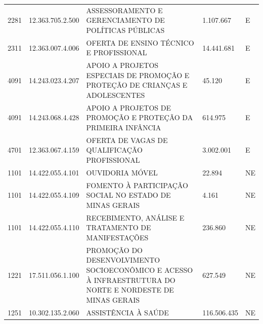 \documentclass{article}
\begin{document}
\begin{longtable}[c]{m{1cm}|m{2cm}|m{10cm}|m{2cm}|m{1cm}}
\multicolumn{1}{C{1cm}|}{2281} & \multicolumn{1}{C{2cm}|}{12.363.705.2.500} & \multicolumn{1}{L{10cm}|}{ASSESSORAMENTO E GERENCIAMENTO DE POLÍTICAS PÚBLICAS} & \multicolumn{1}{R{2cm}|}{1.107.667} & \multicolumn{1}{C{1cm}}{E} \\
\multicolumn{1}{C{1cm}|}{2311} & \multicolumn{1}{C{2cm}|}{12.363.007.4.006} & \multicolumn{1}{L{10cm}|}{OFERTA DE ENSINO TÉCNICO E PROFISSIONAL} & \multicolumn{1}{R{2cm}|}{14.441.681} & \multicolumn{1}{C{1cm}}{E} \\
\multicolumn{1}{C{1cm}|}{4091} & \multicolumn{1}{C{2cm}|}{14.243.023.4.207} & \multicolumn{1}{L{10cm}|}{APOIO A PROJETOS ESPECIAIS DE PROMOÇÃO E PROTEÇÃO DE CRIANÇAS E ADOLESCENTES} & \multicolumn{1}{R{2cm}|}{45.120} & \multicolumn{1}{C{1cm}}{E} \\
\multicolumn{1}{C{1cm}|}{4091} & \multicolumn{1}{C{2cm}|}{14.243.068.4.428} & \multicolumn{1}{L{10cm}|}{APOIO A PROJETOS DE PROMOÇÃO E PROTEÇÃO DA PRIMEIRA INFÂNCIA} & \multicolumn{1}{R{2cm}|}{614.975} & \multicolumn{1}{C{1cm}}{E} \\
\multicolumn{1}{C{1cm}|}{4701} & \multicolumn{1}{C{2cm}|}{12.363.067.4.159} & \multicolumn{1}{L{10cm}|}{OFERTA DE VAGAS DE QUALIFICAÇÃO PROFISSIONAL} & \multicolumn{1}{R{2cm}|}{3.002.001} & \multicolumn{1}{C{1cm}}{E} \\
\multicolumn{1}{C{1cm}|}{1101} & \multicolumn{1}{C{2cm}|}{14.422.055.4.101} & \multicolumn{1}{L{10cm}|}{OUVIDORIA MÓVEL} & \multicolumn{1}{R{2cm}|}{22.894} & \multicolumn{1}{C{1cm}}{NE} \\
\multicolumn{1}{C{1cm}|}{1101} & \multicolumn{1}{C{2cm}|}{14.422.055.4.109} & \multicolumn{1}{L{10cm}|}{FOMENTO À PARTICIPAÇÃO SOCIAL NO ESTADO DE MINAS GERAIS} & \multicolumn{1}{R{2cm}|}{4.161} & \multicolumn{1}{C{1cm}}{NE} \\
\multicolumn{1}{C{1cm}|}{1101} & \multicolumn{1}{C{2cm}|}{14.422.055.4.110} & \multicolumn{1}{L{10cm}|}{RECEBIMENTO, ANÁLISE E TRATAMENTO DE MANIFESTAÇÕES} & \multicolumn{1}{R{2cm}|}{236.860} & \multicolumn{1}{C{1cm}}{NE} \\
\multicolumn{1}{C{1cm}|}{1221} & \multicolumn{1}{C{2cm}|}{17.511.056.1.100} & \multicolumn{1}{L{10cm}|}{PROMOÇÃO DO DESENVOLVIMENTO SOCIOECONÔMICO E ACESSO À INFRAESTRUTURA DO NORTE E NORDESTE DE MINAS GERAIS} & \multicolumn{1}{R{2cm}|}{627.549} & \multicolumn{1}{C{1cm}}{NE} \\
\multicolumn{1}{C{1cm}|}{1251} & \multicolumn{1}{C{2cm}|}{10.302.135.2.060} & \multicolumn{1}{L{10cm}|}{ASSISTÊNCIA À SAÚDE} & \multicolumn{1}{R{2cm}|}{116.506.435} & \multicolumn{1}{C{1cm}}{NE} \\

\end{longtable}
\end{document}

